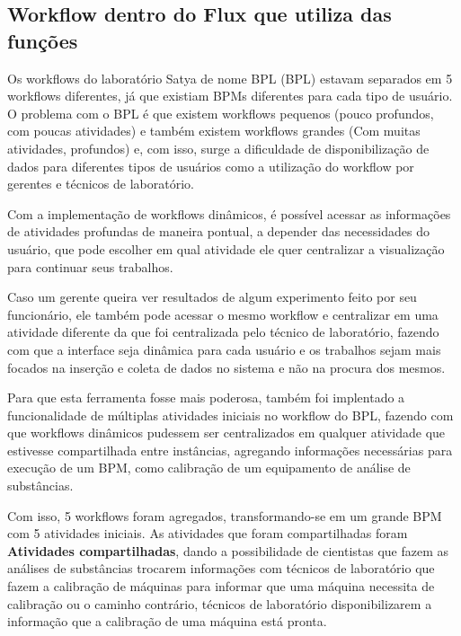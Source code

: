 \subsection{Workflow dentro do Flux que utiliza das funções}

Os workflows do laboratório Satya de nome BPL (BPL) estavam separados em 5 workflows diferentes, já que existiam BPMs diferentes para cada tipo de usuário.
O problema com o BPL é que existem workflows pequenos (pouco profundos, com poucas atividades) e também existem workflows grandes (Com muitas atividades, profundos) e, com isso, surge a dificuldade de disponibilização de dados para diferentes tipos de usuários como a utilização do workflow por gerentes e técnicos de laboratório.

Com a implementação de workflows dinâmicos, é possível acessar as informações de atividades profundas de maneira pontual, a depender das necessidades do usuário, que pode escolher em qual atividade ele quer centralizar a visualização para continuar seus trabalhos.

Caso um gerente queira ver resultados de algum experimento feito por seu funcionário, ele também pode acessar o mesmo workflow e centralizar em uma atividade diferente da que foi centralizada pelo técnico de laboratório, fazendo com que a interface seja dinâmica para cada usuário e os trabalhos sejam mais focados na inserção e coleta de dados no sistema e não na procura dos mesmos.

Para que esta ferramenta fosse mais poderosa, também foi implentado a funcionalidade de múltiplas atividades iniciais no workflow do BPL, fazendo com que workflows dinâmicos pudessem ser centralizados em qualquer atividade que estivesse compartilhada entre instâncias, agregando informações necessárias para execução de um BPM, como calibração de um equipamento de análise de substâncias.

Com isso, 5 workflows foram agregados, transformando-se em um grande BPM com 5 atividades iniciais. As atividades que foram compartilhadas foram \textbf{Atividades compartilhadas}, dando a possibilidade de cientistas que fazem as análises de substâncias trocarem informações com técnicos de laboratório que fazem a calibração de máquinas para informar que uma máquina necessita de calibração ou o caminho contrário, técnicos de laboratório disponibilizarem a informação que a calibração de uma máquina está pronta.